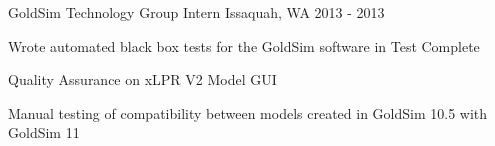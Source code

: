 \begin{cventries}
  \cventry
    {GoldSim Technology Group} %
    {Intern} %
    {Issaquah, WA} %
    {2013 - 2013} %
    {
      \begin{cvitems} %
        \item {Wrote automated black box tests for the GoldSim software in Test Complete}
        \item {Quality Assurance on xLPR V2 Model GUI}
        \item {Manual testing of compatibility between models created in GoldSim 10.5 with GoldSim 11}
      \end{cvitems}
    }

\end{cventries}

